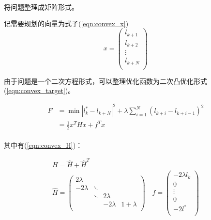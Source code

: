 将问题整理成矩阵形式。

记需要规划的向量为式子(\ref{eqn:convex_x})
\begin{equation}
    {x}=\left( \begin{array}{c}
        l_{k+1}\\
        l_{k+2}\\
        \vdots\\
        l_{k+N}\\
    \end{array} \right) 
    \label{eqn:convex_x}
\end{equation}

由于问题是一个二次方程形式，可以整理优化函数为二次凸优化形式(\ref{eqn:convex_target})。

\begin{equation}
    \begin{aligned}
        F&=\min \left| l_{k}^{*}-l_{k+N} \right|^2+\lambda \sum_{i=1}^N{\left( l_{k+i}-l_{k+i-1} \right) ^2}\\
        &=\frac{1}{2}x^THx+f^Tx\\
    \end{aligned}
    \label{eqn:convex_target}
\end{equation}

其中有(\ref{eqn:convex_H})：

\begin{equation}
    \begin{array}{c}
        H=\hat{H}+\hat{H}^T\\
        \hat{H}=\left( \begin{matrix}
        2\lambda&		&		&		\\
        -2\lambda&		\ddots&		&		\\
        &		\ddots&		2\lambda&		\\
        &		&		-2\lambda&		1+\lambda\\
    \end{matrix} \right) \quad f=\left( \begin{array}{c}
        -2\lambda l_k\\
        0\\
        \vdots\\
        0\\
        -2l^*\\
    \end{array} \right)\\
    \end{array}
    \label{eqn:convex_H}
\end{equation}

